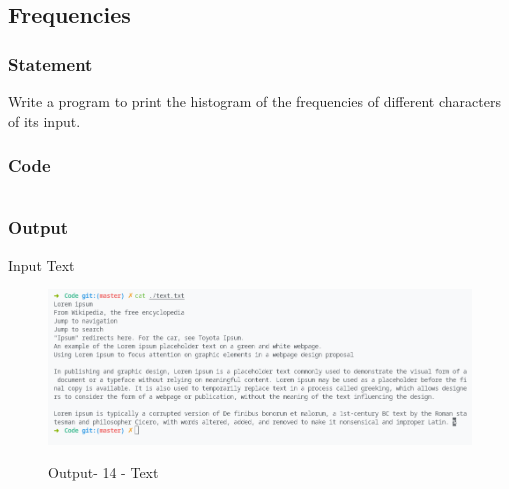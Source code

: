 \pagebreak
\subsection{Frequencies}
\subsubsection{Statement}
Write a program to print the histogram of the frequencies of different characters of its input.
\subsubsection{Code}
\inputminted[]{c}{../Code/histogram.cpp}
\pagebreak
\subsubsection{Output}
Input Text
\begin{figure}[!htb]
  \centering
  \includegraphics[width=6in]{Images/text.png}
  \label{Output-14-Text}
  \caption{Output- 14 - Text}
\end{figure}

